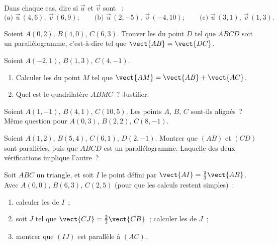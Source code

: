 \begin{exercise}[$\star$]\label{exo:g10:vectors:4}
Dans chaque cas, dire si $\vec u$ et $\vec v$ sont ~:
\[
\text{(a) } \vec u\,(4, 6),\ \vec v\,(6, 9);
\qquad
\text{(b) } \vec u\,(2, -5),\ \vec v\,(-4, 10);
\qquad
\text{(c) } \vec u\,(3, 1),\ \vec v\,(1, 3).
\]
\end{exercise}

\begin{exercise}[$\star$]\label{exo:g10:vectors:5}
Soient $A(0, 2)$, $B(4, 0)$, $C(6, 3)$. Trouver les  du
point $D$ tel que $ABCD$ soit un parallélogramme, c'est-à-dire tel que
$\vect{AB} = \vect{DC}$.
\end{exercise}

\begin{exercise}[$\star\star$]\label{exo:g10:vectors:6}
Soient $A(-2, 1)$, $B(1, 3)$, $C(4, -1)$.
\begin{enumerate}
  \item Calculer les  du point $M$ tel que
        $\vect{AM} = \vect{AB} + \vect{AC}$.
  \item Quel est le quadrilatère $ABMC$~? Justifier.
\end{enumerate}
\end{exercise}

\begin{exercise}[$\star\star$]\label{exo:g10:vectors:7}
Soient $A(1, -1)$, $B(4, 1)$, $C(10, 5)$. Les points $A$, $B$, $C$
sont-ils alignés~? Même question pour $A(0, 3)$, $B(2, 2)$, $C(8, -1)$.
\end{exercise}

\begin{exercise}[$\star\star$]\label{exo:g10:vectors:8}
Soient $A(1, 2)$, $B(5, 4)$, $C(6, 1)$, $D(2, -1)$. Montrer que $(AB)$
et $(CD)$ sont parallèles, puis que $ABCD$ est un parallélogramme.
Laquelle des deux vérifications implique l'autre~?
\end{exercise}

\begin{exercise}[$\star\star$]\label{exo:g10:vectors:9}
Soit $ABC$ un triangle, et soit $I$ le point défini par
$\vect{AI} = \frac23 \vect{AB}$. Avec $A(0,0)$, $B(6, 3)$, $C(2, 5)$
(pour que les calculs restent simples)~:
\begin{enumerate}
  \item calculer les  de $I$~;
  \item soit $J$ tel que $\vect{CJ} = \frac23\vect{CB}$~; calculer les
         de $J$~;
  \item montrer que $(IJ)$ est parallèle à $(AC)$.
\end{enumerate}
\end{exercise}

